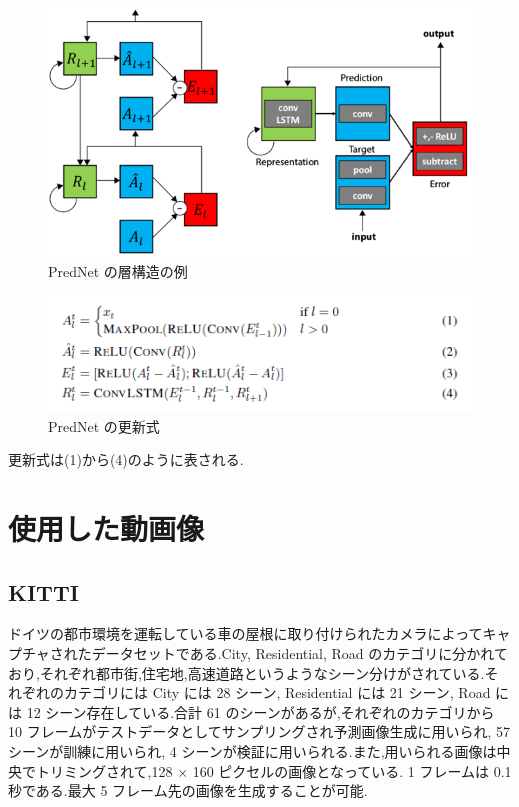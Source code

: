  \begin{figure}[hb]
\includegraphics[scale=0.4]{prednet.png}
 \caption{PredNet の層構造の例}
\end{figure}
\begin{figure}[hb]
\includegraphics[scale=0.4]{DeepPrednet_formula.png}
 \caption{PredNet の更新式}
\end{figure}
更新式は(1)から(4)のように表される.

\section{使用した動画像}
\subsection{KITTI}
ドイツの都市環境を運転している車の屋根に取り付けられたカメラによってキャプチャされたデータセットである.City, Residential, Road のカテゴリに分かれており,それぞれ都市街,住宅地,高速道路というようなシーン分けがされている.それぞれのカテゴリには City には 28 シーン, Residential には 21 シーン, Road には 12 シーン存在している.合計 61 のシーンがあるが,それぞれのカテゴリから 10 フレームがテストデータとしてサンプリングされ予測画像生成に用いられ, 57 シーンが訓練に用いられ, 4 シーンが検証に用いられる.また,用いられる画像は中央でトリミングされて,128 × 160 ピクセルの画像となっている. 1 フレームは 0.1 秒である.最大 5 フレーム先の画像を生成することが可能.

